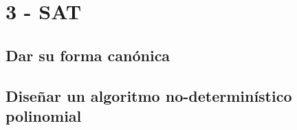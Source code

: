 \section{3 - SAT}

\subsection{Dar su forma canónica}

\subsection{Diseñar un algoritmo no-determinístico polinomial}